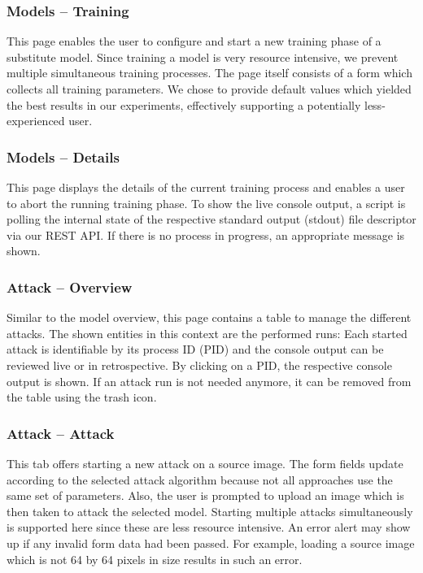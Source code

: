 \subsubsection{Models -- Training}
This page enables the user to configure and start a new training phase of a substitute model. 
Since training a model is very resource intensive, we prevent multiple simultaneous training processes.
The page itself consists of a form which collects all training parameters.
We chose to provide default values which yielded the best results in our experiments, effectively supporting a potentially less-experienced user.

\subsubsection{Models -- Details}
This page displays the details of the current training process and enables a user to abort the running training phase.
To show the live console output, a script is polling the internal state of the respective standard output (stdout) file descriptor via our REST API. 
If there is no process in progress, an appropriate message is shown.

\subsubsection{Attack -- Overview}
Similar to the model overview, this page contains a table to manage the different attacks.
The shown entities in this context are the performed runs: Each started attack is identifiable by its process ID (PID) and the console output can be reviewed live or in retrospective.
By clicking on a PID, the respective console output is shown.
If an attack run is not needed anymore, it can be removed from the table using the trash icon.

\subsubsection{Attack -- Attack}
This tab offers starting a new attack on a source image.
The form fields update according to the selected attack algorithm because not all approaches use the same set of parameters.
Also, the user is prompted to upload an image which is then taken to attack the selected model.
Starting multiple attacks simultaneously is supported here since these are less resource intensive.
An error alert may show up if any invalid form data had been passed.
For example, loading a source image which is not 64 by 64 pixels in size results in such an error.

